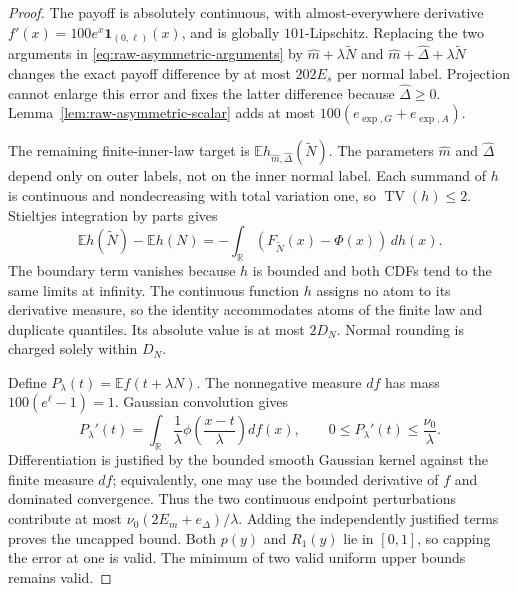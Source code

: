 \begin{proof}
The payoff is absolutely continuous, with almost-everywhere derivative
$f'(x)=100e^x\mathbf1_{(0,\ell)}(x)$, and is globally
$101$-Lipschitz. Replacing the two arguments in
\eqref{eq:raw-asymmetric-arguments} by
$\widehat m+\lambda\widetilde N$ and
$\widehat m+\widehat\Delta+\lambda\widetilde N$ changes the exact
payoff difference by at most $202E_s$ per normal label. Projection
cannot enlarge this error and fixes the latter difference because
$\widehat\Delta\geq0$. Lemma~\ref{lem:raw-asymmetric-scalar}
adds at most $100(e_{\exp,G}+e_{\exp,A})$.

The remaining finite-inner-law target is
$\mathbb E h_{\widehat m,\widehat\Delta}(\widetilde N)$. The
parameters $\widehat m$ and $\widehat\Delta$ depend only on outer
labels, not on the inner normal label. Each summand of $h$ is
continuous and nondecreasing with total variation one, so
$\operatorname{TV}(h)\leq2$. Stieltjes integration by parts gives
\begin{equation}
 \mathbb E h(\widetilde N)-\mathbb E h(N)
   =-\int_{\mathbb R}(F_{\widetilde N}(x)-\Phi(x))\,dh(x).
\end{equation}
The boundary term vanishes because $h$ is bounded and both CDFs tend
to the same limits at infinity. The continuous function $h$ assigns
no atom to its derivative measure, so the identity accommodates
atoms of the finite law and duplicate quantiles. Its absolute value
is at most $2D_N$. Normal rounding is charged solely within $D_N$.

Define $P_\lambda(t)=\mathbb E f(t+\lambda N)$. The nonnegative
measure $df$ has mass
$100(e^\ell-1)=1$. Gaussian convolution gives
\begin{equation}
 P_\lambda'(t)=\int_{\mathbb R}
       \frac1\lambda\phi\left(\frac{x-t}{\lambda}\right)df(x),
 \qquad 0\leq P_\lambda'(t)\leq\frac{\nu_0}{\lambda}.
\end{equation}
Differentiation is justified by the bounded smooth Gaussian kernel
against the finite measure $df$; equivalently, one may use the
bounded derivative of $f$ and dominated convergence. Thus the two
continuous endpoint perturbations contribute at most
$\nu_0(2E_m+e_\Delta)/\lambda$. Adding the independently justified
terms proves the uncapped bound. Both $p(y)$ and $R_1(y)$ lie in
$[0,1]$, so capping the error at one is valid. The minimum of two
valid uniform upper bounds remains valid.
\end{proof}

